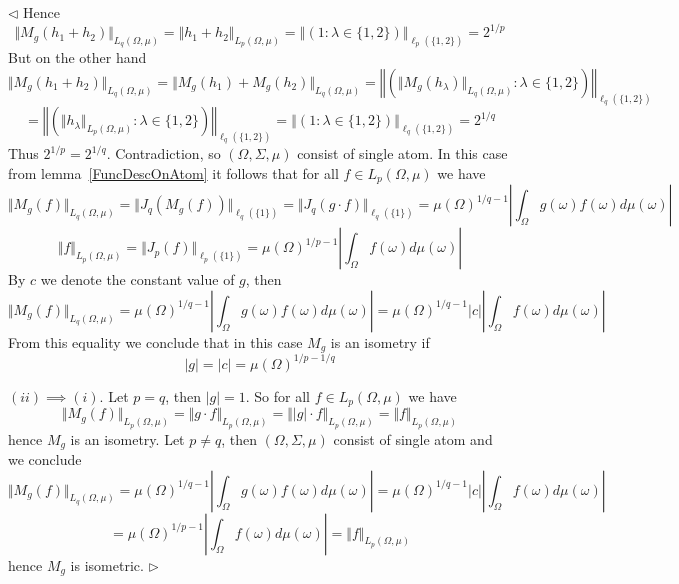 \documentclass[12pt]{article}
\newenvironment{proof}{\par $\triangleleft$}{$\triangleright$}
\begin{document}
\begin{proof}
    Hence
    $$
        \Vert M_g(h_1+h_2)\Vert_{L_q(\Omega,\mu)} =\Vert
        h_1+h_2\Vert_{L_p(\Omega,\mu)} =\left\Vert\left( 1 :\lambda\in \{1,2
        \}\right)\right\Vert_{\ell_p( \{1,2 \})} =2^{1/p}
    $$
    But on the other hand
    $$
        \Vert M_g(h_1+h_2)\Vert_{L_q(\Omega,\mu)} =\Vert
        M_g(h_1)+M_g(h_2)\Vert_{L_q(\Omega,\mu)} =\left\Vert\left(\Vert
        M_g(h_\lambda)\Vert_{L_q(\Omega,\mu)}:\lambda\in \{1,2
        \}\right)\right\Vert_{\ell_q( \{1,2 \})}
    $$
    $$
        =\left\Vert\left(\Vert h_\lambda\Vert_{L_p(\Omega,\mu)}:\lambda\in \{1,2
        \}\right)\right\Vert_{\ell_q( \{1,2 \})} =\left\Vert\left(1:\lambda\in
        \{1,2 \}\right)\right\Vert_{\ell_q( \{1,2 \})} =2^{1/q}
    $$
    Thus $2^{1/p}=2^{1/q}$. Contradiction, so $(\Omega,\Sigma,\mu)$ consist of
    single atom. In this case from lemma~\ref{FuncDescOnAtom} it follows that
    for all $f\in L_p(\Omega,\mu)$ we have
    $$
        \Vert M_g(f)\Vert_{L_q(\Omega,\mu)} =\Vert J_q(M_g(f))\Vert_{\ell_q( \{1
            \})} =\Vert J_q(g\cdot f)\Vert_{\ell_q( \{1 \})}
        ={\mu(\Omega)}^{1/q-1}\left|\int_\Omega g(\omega)
        f(\omega)d\mu(\omega)\right|
    $$
    $$
        \Vert f\Vert_{L_p(\Omega,\mu)} =\Vert J_p(f)\Vert_{\ell_p( \{1 \})}
        ={\mu(\Omega)}^{1/p-1}\left|\int_\Omega f(\omega)d\mu(\omega)\right|
    $$
    By $c$ we denote the constant value of $g$, then
    $$
        \Vert M_g(f)\Vert_{L_q(\Omega,\mu)}
        ={\mu(\Omega)}^{1/q-1}\left|\int_\Omega g(\omega)
        f(\omega)d\mu(\omega)\right|
        ={\mu(\Omega)}^{1/q-1}|c|\left|\int_\Omega
        f(\omega)d\mu(\omega)\right|
    $$
    From this equality we conclude that in this case $M_g$ is an isometry if
    $$
        |g|=|c|={\mu(\Omega)}^{1/p-1/q}
    $$

    $(ii)\implies (i)$. Let $p=q$, then $|g|=1$. So for
    all $f\in L_p(\Omega,\mu)$ we have
    $$
        \Vert M_g(f)\Vert_{L_p(\Omega,\mu)} =\Vert g\cdot
        f\Vert_{L_p(\Omega,\mu)} =\Vert |g|\cdot f\Vert_{L_p(\Omega,\mu)} =\Vert
        f\Vert_{L_p(\Omega,\mu)}
    $$
    hence $M_g$ is an isometry. Let $p\neq q$, then $(\Omega,\Sigma,\mu)$
    consist of single atom and we conclude
    $$
        \Vert M_g(f)\Vert_{L_q(\Omega,\mu)}
        ={\mu(\Omega)}^{1/q-1}\left|\int_\Omega g(\omega)
        f(\omega)d\mu(\omega)\right|={\mu(\Omega)}^{1/q-1}|c|\left|\int_\Omega
        f(\omega)d\mu(\omega)\right|
    $$
    $$
        ={\mu(\Omega)}^{1/p-1}\left|\int_\Omega f(\omega)d\mu(\omega)\right|
        =\Vert f\Vert_{L_p(\Omega,\mu)}
    $$
    hence $M_g$ is isometric.
\end{proof}
\end{document}
